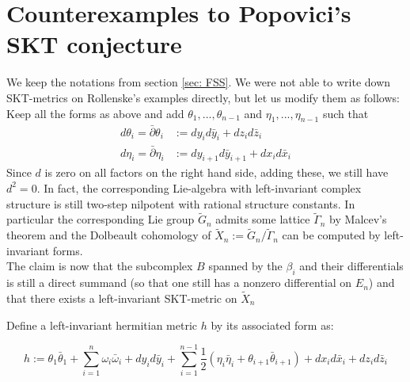 \documentclass[12pt,reqno]{amsart}
\theoremstyle{definition}
\newcommand{\Z}{\mathbb{Z}}
\newcommand{\C}{\mathbb{C}}
\newcommand{\del}{\partial}
\newcommand{\delbar}{\bar{\del}}
\begin{document}

\appendix


\section{Counterexamples to Popovici's SKT conjecture}\label{app: SKTvsFSS}
We keep the notations from section \ref{sec: FSS}. We were not able to write down SKT-metrics on Rollenske's examples directly, but let us modify them as follows: Keep all the forms as above and add $\theta_1,...,\theta_{n-1}$ and $\eta_1,...,\eta_{n-1}$ such that
\begin{align*}
d\theta_i=\delbar\theta_i&:=dy_id\bar{y}_i+dz_id\bar{z}_i\\
d\eta_i=\delbar\eta_i&:=dy_{i+1}d\bar{y}_{i+1}+dx_{i}d\bar{x}_{i}
\end{align*}
Since $d$ is zero on all factors on the right hand side, adding these, we still have $d^2=0$. In fact, the corresponding Lie-algebra with left-invariant complex structure is still two-step nilpotent with rational structure constants. In particular the corresponding Lie group $\tilde{G}_n$ admits some lattice $\tilde{\Gamma}_n$ by Malcev's theorem and the Dolbeault cohomology of $\tilde{X}_n:=\tilde{G}_n/\tilde{\Gamma}_n$ can be computed by left-invariant forms.\\

The claim is now that the subcomplex $B$ spanned by the $\beta_i$ and their differentials is still a direct summand (so that one still has a nonzero differential on $E_n$) and that there exists a left-invariant SKT-metric on $\tilde{X}_n$

Define a left-invariant hermitian metric $h$ by its associated form as:

\[
h:=\theta_1\bar\theta_1+\sum_{i=1}^n\omega_i\bar{\omega}_i+dy_id\bar{y}_i + \sum_{i=1}^{n-1}\frac{1}{2}(\eta_i\bar\eta_i+\theta_{i+1}\bar\theta_{i+1}) + dx_id\bar{x}_i+dz_id\bar{z}_i
\]
\end{document}
